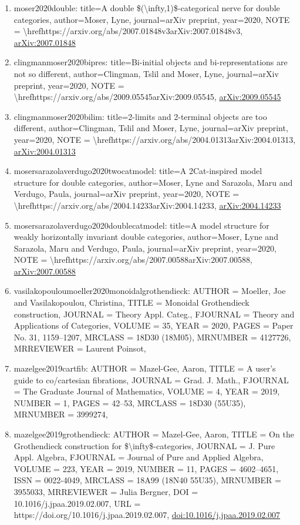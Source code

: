 \documentclass[11pt]{article}
\begin{document}
\begin{enumerate}[leftmargin=*]
  \item moser2020double: title=A double \$(\textbackslash{}infty,1)\$-categorical nerve for double categories, author=Moser, Lyne, journal=arXiv preprint, year=2020, NOTE = \textbackslash{}hrefhttps://arxiv.org/abs/2007.01848v3arXiv:2007.01848v3, \href{https://arxiv.org/abs/2007.01848}{arXiv:2007.01848}
  \item clingmanmoser2020bipres: title=Bi-initial objects and bi-representations are not so different, author=Clingman, Tslil and Moser, Lyne, journal=arXiv preprint, year=2020, NOTE = \textbackslash{}hrefhttps://arxiv.org/abs/2009.05545arXiv:2009.05545, \href{https://arxiv.org/abs/2009.05545}{arXiv:2009.05545}
  \item clingmanmoser2020bilim: title=2-limits and 2-terminal objects are too different, author=Clingman, Tslil and Moser, Lyne, journal=arXiv preprint, year=2020, NOTE = \textbackslash{}hrefhttps://arxiv.org/abs/2004.01313arXiv:2004.01313, \href{https://arxiv.org/abs/2004.01313}{arXiv:2004.01313}
  \item mosersarazolaverdugo2020twocatmodel: title=A 2Cat-inspired model structure for double categories, author=Moser, Lyne and Sarazola, Maru and Verdugo, Paula, journal=arXiv preprint, year=2020, NOTE = \textbackslash{}hrefhttps://arxiv.org/abs/2004.14233arXiv:2004.14233, \href{https://arxiv.org/abs/2004.14233}{arXiv:2004.14233}
  \item mosersarazolaverdugo2020doublecatmodel: title=A model structure for weakly horizontally invariant double categories, author=Moser, Lyne and Sarazola, Maru and Verdugo, Paula, journal=arXiv preprint, year=2020, NOTE = \textbackslash{}hrefhttps://arxiv.org/abs/2007.00588arXiv:2007.00588, \href{https://arxiv.org/abs/2007.00588}{arXiv:2007.00588}
  \item vasilakopouloumoeller2020monoidalgrothendieck: AUTHOR = Moeller, Joe and Vasilakopoulou, Christina, TITLE = Monoidal Grothendieck construction, JOURNAL = Theory Appl. Categ., FJOURNAL = Theory and Applications of Categories, VOLUME = 35, YEAR = 2020, PAGES = Paper No. 31, 1159--1207, MRCLASS = 18D30 (18M05), MRNUMBER = 4127726, MRREVIEWER = Laurent Poinsot,
  \item mazelgee2019cartfib: AUTHOR = Mazel-Gee, Aaron, TITLE = A user's guide to co/cartesian fibrations, JOURNAL = Grad. J. Math., FJOURNAL = The Graduate Journal of Mathematics, VOLUME = 4, YEAR = 2019, NUMBER = 1, PAGES = 42--53, MRCLASS = 18D30 (55U35), MRNUMBER = 3999274,
  \item mazelgee2019grothendieck: AUTHOR = Mazel-Gee, Aaron, TITLE = On the Grothendieck construction for \$\textbackslash{}infty\$-categories, JOURNAL = J. Pure Appl. Algebra, FJOURNAL = Journal of Pure and Applied Algebra, VOLUME = 223, YEAR = 2019, NUMBER = 11, PAGES = 4602--4651, ISSN = 0022-4049, MRCLASS = 18A99 (18N40 55U35), MRNUMBER = 3955033, MRREVIEWER = Julia Bergner, DOI = 10.1016/j.jpaa.2019.02.007, URL = https://doi.org/10.1016/j.jpaa.2019.02.007, \href{https://doi.org/10.1016/j.jpaa.2019.02.007}{doi:10.1016/j.jpaa.2019.02.007}

\end{enumerate}
\end{document}
